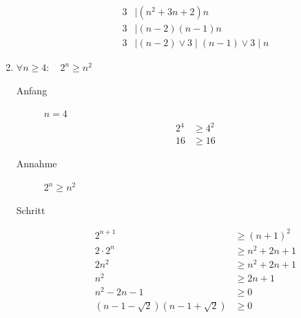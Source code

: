 \documentclass[11pt, a4paper]{article}
\begin{document}
\begin{enumerate}
\begin{description}
\begin{align*}
				3 &\mid (n^2+3n+2)n \\
				3 &\mid (n-2)(n-1)n \\
				3 &\mid (n-2) \lor 3 \mid (n-1) \lor 3 \mid n
			\end{align*}
		\end{description}
	\item $\forall n \geq 4 : \quad 2^n \geq n^2$
		\begin{description}
			\item[Anfang] $n=4$
				\begin{align*}
					2^4 &\geq 4^2 \\
					16 &\geq 16
				\end{align*}
			\item[Annahme] $2^n \geq n^2$
			\item[Schritt] 
				\begin{align*}
					2^{n+1} &\geq (n+1)^2 \\
					2 \cdot 2^n &\geq n^2 + 2n + 1 \tag{Verwende Annahme} \\
					2 n^2 &\geq n^2 + 2n + 1 \tag{$- n^2$} \\
					n^2 &\geq 2n + 1 \\
					n^2 -2n - 1 &\geq 0 \tag{Zerlegung in Linearfaktoren} \\
					(n-1-\sqrt{2})(n-1+\sqrt{2}) &\geq 0 \tag{Beide Terme $\geq 0$ weil $n \geq 4$}
				\end{align*}
		\end{description}
\end{enumerate}
\end{document}
